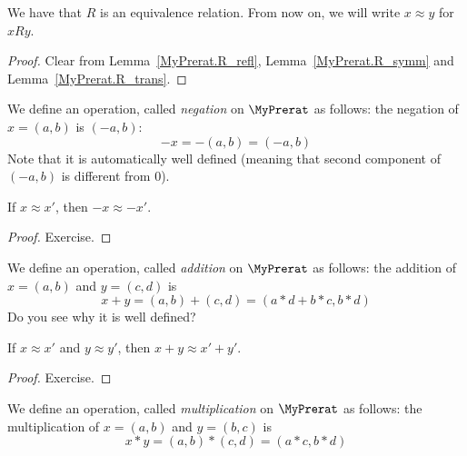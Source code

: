 \begin{lemma}
    \label{MyPrerat.R_equiv}
    \leanok
We have that $R$ is an equivalence relation. From now on, we will write $x \approx y$ for
$x R y$.
\end{lemma}
\begin{proof}
    \leanok
Clear from Lemma~\ref{MyPrerat.R_refl}, Lemma~\ref{MyPrerat.R_symm} and Lemma~\ref{MyPrerat.R_trans}.
\end{proof}

\begin{definition}
    \label{MyPrerat.neg}
    \leanok
We define an operation, called \emph{negation} on $\MyPrerat$ as follows: the negation of $x = (a,b)$ is
$(-a,b)$:
\[
-x = -(a,b) = (-a,b)
\]
Note that it is automatically well defined (meaning that second component of $(-a,b)$ is different from $0$).
\end{definition}

\begin{lemma}
    \label{MyPrerat.neg_quotient}
    \leanok
If $x \approx x'$, then $-x \approx -x'$.
\end{lemma}
\begin{proof}
\leanok
Exercise.
\end{proof}

\begin{definition}
    \label{MyPrerat.add}
    \leanok
We define an operation, called \emph{addition} on $\MyPrerat$ as follows: the addition of $x = (a,b)$
and $y = (c, d)$ is
\[
x + y = (a,b) + (c,d) = (a * d + b * c, b*d)
\]
Do you see why it is well defined?
\end{definition}

\begin{lemma}
    \label{MyPrerat.add_quotient}
    \leanok
If $x \approx x'$ and $y \approx y'$, then $x + y \approx x' + y'$.
\end{lemma}
\begin{proof}
\leanok
Exercise.
\end{proof}

\begin{definition}
    \label{MyPrerat.mul}
    \leanok
We define an operation, called \emph{multiplication} on $\MyPrerat$ as follows: the multiplication of $x = (a,b)$ and $y = (b, c)$ is
\[
x * y = (a,b) * (c,d) = (a*c, b*d)
\]
\end{definition}

